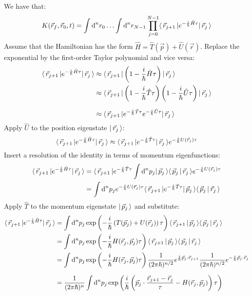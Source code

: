 \documentclass[a4paper]{extarticle}
\newcommand{\dnp}[2]{\text{d}^{#1}p_{#2}}
\newcommand{\dnr}[2]{\text{d}^{#1}r_{#2}}
\newcommand{\ihbar}{\frac{i}{\hbar}}
\newcommand{\propagator}{K(\vec{r}_f, \vec{r}_0, t)}
\begin{document}
We have that:
\begin{equation}
  \label{start}
  \propagator = \int\dnr{n}{0}\ldots\int\dnr{n}{N - 1}
  \prod_{j = 0}^{N - 1} \bra{\vec{r}_{j + 1}} e^{-\ihbar \hat{H}\tau} \ket{\vec{r}_j}
\end{equation}
Assume that the Hamiltonian has the form
$\hat{H} = \hat{T}(\vec{p}) + \hat{U}(\vec{r})$.
Replace the exponential by the first-order Taylor polynomial and vice versa:
\begin{align*}
  \bra{\vec{r}_{j + 1}}
  e^{-\ihbar\hat{H}\tau}
  \ket{\vec{r}_j}
   & \approx
  \bra{\vec{r}_{j + 1}}
  \left(1 - \ihbar\hat{H}\tau\right)
  \ket{\vec{r}_j}
  \\
   & \approx
  \bra{\vec{r}_{j + 1}}
  \left(1 - \ihbar\hat{T}\tau\right)
  \left(1 - \ihbar\hat{U}\tau\right)
  \ket{\vec{r}_j}
  \\[1.5ex]
   & \approx
  \bra{\vec{r}_{j + 1}}
  e^{-\ihbar \hat{T}\tau} e^{-\ihbar \hat{U}\tau}
  \ket{\vec{r}_j}
\end{align*}
Apply $\hat{U}$ to the position eigenstate $\lvert\,\vec{r}_j\,\rangle$:
\begin{equation*}
  \bra{\vec{r}_{j + 1}}
  e^{-\ihbar\hat{H}\tau}
  \ket{\vec{r}_j}
  \approx \bra{\vec{r}_{j + 1}}
  e^{-\ihbar \hat{T}\tau}
  \ket{\vec{r}_j}
  e^{-\ihbar U(\vec{r}_j)\tau}
\end{equation*}
Insert a resolution of the identity in terms of momentum eigenfunctions:
\begin{align*}
  \bra{\vec{r}_{j + 1}}
  e^{-\ihbar \hat{H}\tau}
  \ket{\vec{r}_j}
   & =
  \bra{\vec{r}_{j + 1}}
  e^{-\ihbar \hat{T}\tau}
  \int\dnp{n}{j}
  \ket{\vec{p}_j}
  \braket{\vec{p}_j}{\vec{r}_j}
  e^{-\ihbar U(\vec{r}_j)\tau}
  \\
   & =
  \int\dnp{n}{j}
  e^{-\ihbar U(\vec{r}_j)\tau}
  \bra{\vec{r}_{j + 1}}
  e^{-\ihbar \hat{T}\tau}
  \ket{\vec{p}_j}
  \braket{\vec{p}_j}{\vec{r}_j}
\end{align*}
Apply $\hat{T}$ to the momentum eigenstate $\lvert\,\vec{p}_j\,\rangle$ and substitute:
\begin{align*}
  \bra{\vec{r}_{j + 1}}
  e^{-\ihbar\hat{H}\tau}
  \ket{\vec{r}_j}
   & =
  \int\dnp{n}{j}
  \exp\left(-\ihbar\left(T(\vec{p}_j) + U(\vec{r}_j)\right)\tau\right)
  \braket{\vec{r}_{j + 1}}{\vec{p}_j}
  \braket{\vec{p}_j}{\vec{r}_j}
  \\
   & =
  \int\dnp{n}{j}
  \exp\left(-\ihbar H(\vec{r}_j, \vec{p}_j)\tau\right)
  \braket{\vec{r}_{j + 1}}{\vec{p}_j}
  \braket{\vec{p}_j}{\vec{r}_j}
  \\
   & =
  \int\dnp{n}{j}
  \exp\left(-\ihbar H(\vec{r}_j, \vec{p}_j)\tau\right)
  \frac{1}{(2\pi\hbar)^{n/2}} e^{\ihbar\vec{p}_j \cdot \vec{r}_{j + 1}}
  \frac{1}{(2\pi\hbar)^{n/2}} e^{-\ihbar\vec{p}_j \cdot \vec{r}_{j}}
  \\[1.5ex]
   & =
  \frac{1}{(2\pi\hbar)^{n}}
  \int\dnp{n}{j}
  \exp\left(\ihbar\left(
  \vec{p}_j\cdot\frac{\vec{r}_{j + 1}-\vec{r}_j}{\tau} - H(\vec{r}_j, \vec{p}_j)
  \right)\tau\right)
\end{align*}
\end{document}
